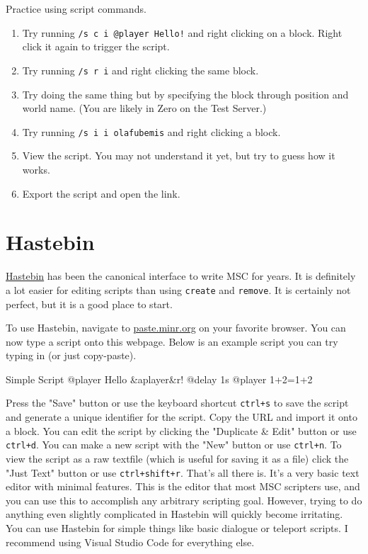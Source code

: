 \documentclass[oneside]{book}
\begin{document}
\begin{thinkbox}
Practice using script commands.
\begin{enumerate}
    \item Try running \texttt{/s c i @player Hello!} and right clicking on a block. Right click it again to trigger the script.
    \item Try running \texttt{/s r i} and right clicking the same block.
    \item Try doing the same thing but by specifying the block through position and world name. (You are likely in Zero on the Test Server.)
    \item Try running \texttt{/s i i olafubemis} and right clicking a block.
    \item View the script. You may not understand it yet, but try to guess how it works.
    \item Export the script and open the link.
\end{enumerate}
\end{thinkbox}

\section{Hastebin}
\href{https://paste.minr.org}{Hastebin} has been the canonical interface to write MSC for years. It is definitely a lot easier for editing scripts than using \texttt{create} and \texttt{remove}. It is certainly not perfect, but it is a good place to start.

To use Hastebin, navigate to \href{https://paste.minr.org}{paste.minr.org} on your favorite browser. You can now type a script onto this webpage. Below is an example script you can try typing in (or just copy-paste).

\begin{msccode}{Simple Script}
@player Hello &a{{player}}&r!
@delay 1s
@player 1+2={{1+2}}
\end{msccode}

Press the "Save" button or use the keyboard shortcut \texttt{ctrl+s} to save the script and generate a unique identifier for the script. Copy the URL and import it onto a block. You can edit the script by clicking the "Duplicate \& Edit" button or use \texttt{ctrl+d}. You can make a new script with the "New" button or use \texttt{ctrl+n}. To view the script as a raw textfile (which is useful for saving it as a file) click the "Just Text" button or use \texttt{ctrl+shift+r}. That's all there is. It's a very basic text editor with minimal features. This is the editor that most MSC scripters use, and you can use this to accomplish any arbitrary scripting goal. However, trying to do anything even slightly complicated in Hastebin will quickly become irritating. You can use Hastebin for simple things like basic dialogue or teleport scripts. I recommend using Visual Studio Code for everything else.
\end{document}
